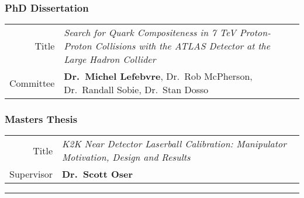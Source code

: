 \documentclass[12pt,a4paper]{article}
\newcommand{\colorrule}[1]
{
  {\color{#1}\hrule height 2pt}
  \vspace{1.0em}
}
\begin{document}
\subsubsection*{PhD Dissertation}
\begin{tabular}{r p{14.3cm}}
	Title     & {\it Search for Quark Compositeness in 7 TeV Proton-Proton
							 Collisions with the ATLAS Detector at the Large Hadron
							 Collider} \\
	Committee & {\bf Dr.\ Michel Lefebvre}, Dr.\ Rob McPherson,
							 Dr.\ Randall Sobie, Dr.\ Stan Dosso \\
\end{tabular}

\subsubsection*{Masters Thesis}
\begin{tabular}{r p{14.3cm}}
	Title & {\it K2K Near Detector Laserball Calibration: Manipulator Motivation, Design
	 				 and Results} \\
	Supervisor & {\bf Dr.\ Scott Oser} \\
\end{tabular}
\vspace{1em}
\colorrule{NavyBlue}
\end{document}
